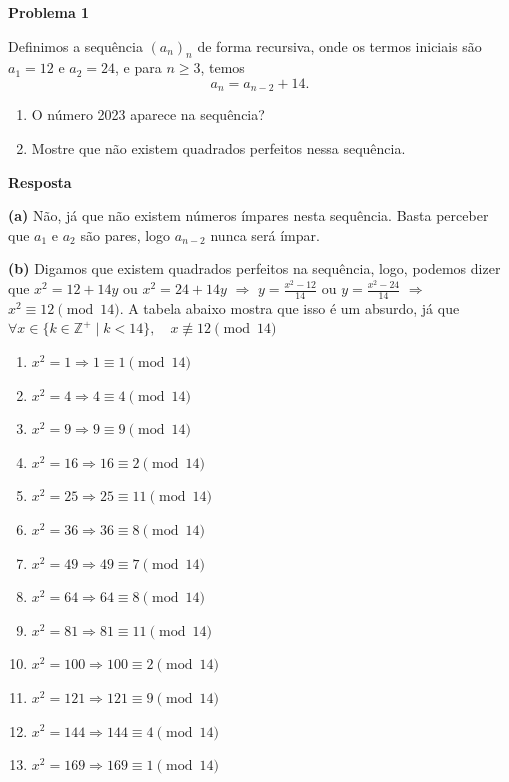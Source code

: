 \documentclass{article}
\begin{document}
  {\centering \textbf{Problema 1} \par}
  Definimos a sequência \( (a_n)_n \) de forma recursiva, onde os termos iniciais são \( a_1 = 12 \) e \( a_2 = 24 \), e para \( n \geq 3 \), temos
  \[
    a_n = a_{n-2} + 14.
  \]
  \begin{enumerate}[label=(\alph*)]
    \item O número 2023 aparece na sequência?
    \item Mostre que não existem quadrados perfeitos nessa sequência.
  \end{enumerate}

  \medskip

  {\centering \textbf{Resposta} \par}

  \textbf{(a)} Não, já que não existem números ímpares nesta sequência. Basta perceber que $a_1$ e $a_2$ são pares, logo $a_{n-2}$ nunca será ímpar.

  \textbf{(b)} Digamos que existem quadrados perfeitos na sequência, logo, podemos dizer que $x^2 = 12 + 14y$ ou $x^2 = 24 + 14y$ $\Rightarrow$ $y = \frac{x^2 - 12}{14} $ ou 
  $y = \frac{x^2 - 24}{14}$ $\Rightarrow$ $x^2 \equiv 12 \pmod{14}$. A tabela abaixo mostra que isso é um absurdo, já que $\forall x \in \{k \in \mathbb{Z}^+ \mid k < 14 \},
  \quad x \not\equiv 12 \pmod{14}$
  \begin{multicols}{2}
    \begin{enumerate}
      \item $x^2 = 1 \Rightarrow 1 \equiv 1 \pmod{14}$
      \item $x^2 = 4 \Rightarrow 4 \equiv 4 \pmod{14}$
      \item $x^2 = 9 \Rightarrow 9 \equiv 9 \pmod{14}$
      \item $x^2 = 16 \Rightarrow 16 \equiv 2 \pmod{14}$
      \item $x^2 = 25 \Rightarrow 25 \equiv 11 \pmod{14}$
      \item $x^2 = 36 \Rightarrow 36 \equiv 8 \pmod{14}$
      \item $x^2 = 49 \Rightarrow 49 \equiv 7 \pmod{14}$
      \item $x^2 = 64 \Rightarrow 64 \equiv 8 \pmod{14}$
      \item $x^2 = 81 \Rightarrow 81 \equiv 11 \pmod{14}$
      \item $x^2 = 100 \Rightarrow 100 \equiv 2 \pmod{14}$
      \item $x^2 = 121 \Rightarrow 121 \equiv 9 \pmod{14}$
      \item $x^2 = 144 \Rightarrow 144 \equiv 4 \pmod{14}$
      \item $x^2 = 169 \Rightarrow 169 \equiv 1 \pmod{14}$
    \end{enumerate}
  \end{multicols}
\end{document}
